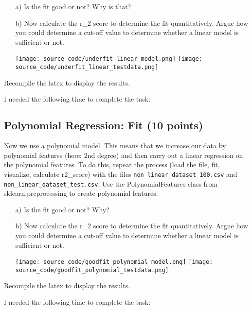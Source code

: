 \begin{enumerate}

\item[a)] Is the fit good or not? Why is that? 

\item[b)] Now calculate the r\_2 score to determine the fit quantitatively. Argue how you could determine a cut-off value to determine whether a linear model is sufficient or not.

\texttt{[image: source\_code/underfit\_linear\_model.png]}
\texttt{[image: source\_code/underfit\_linear\_testdata.png]}

\end{enumerate}

Recompile the latex to display the results.

I needed the following time to complete the task:

\subsection{Polynomial Regression: Fit (10 points)}

Now we use a polynomial model. This means that we increase our data by polynomial features (here: 2nd degree) and then carry out a linear regression on the
polynomial features. To do this, repeat the process (load the file, fit, visualize, calculate r2\_score) with the files \texttt{non\_linear\_dataset\_100.csv} and \texttt{non\_linear\_dataset\_test.csv}.
Use the PolynomialFeatures class from sklearn.preprocessing to create polynomial features. 

\begin{enumerate}

\item[a)] Is the fit good or not? Why? 

\item[b)] Now calculate the r\_2 score to determine the fit quantitatively. Argue how you could determine a cut-off value to determine whether a linear model is sufficient or not.

\texttt{[image: source\_code/goodfit\_polynomial\_model.png]}
\texttt{[image: source\_code/goodfit\_polynomial\_testdata.png]}

\end{enumerate}

Recompile the latex to display the results.

I needed the following time to complete the task:


